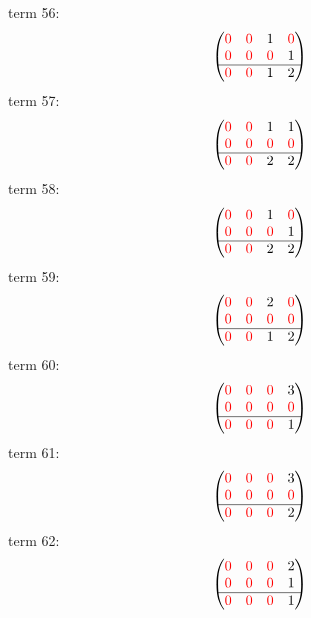 \documentclass{article}
\begin{document}
term 56:
$$\begin{pmatrix}{\color{red} 0} & {\color{red} 0} & 1 & {\color{red} 0}\\
{\color{red} 0} & {\color{red} 0} & {\color{red} 0} & 1\\
\hline{\color{red} 0} & {\color{red} 0} & 1 & 2\\
\end{pmatrix}$$
term 57:
$$\begin{pmatrix}{\color{red} 0} & {\color{red} 0} & 1 & 1\\
{\color{red} 0} & {\color{red} 0} & {\color{red} 0} & {\color{red} 0}\\
\hline{\color{red} 0} & {\color{red} 0} & 2 & 2\\
\end{pmatrix}$$
term 58:
$$\begin{pmatrix}{\color{red} 0} & {\color{red} 0} & 1 & {\color{red} 0}\\
{\color{red} 0} & {\color{red} 0} & {\color{red} 0} & 1\\
\hline{\color{red} 0} & {\color{red} 0} & 2 & 2\\
\end{pmatrix}$$
term 59:
$$\begin{pmatrix}{\color{red} 0} & {\color{red} 0} & 2 & {\color{red} 0}\\
{\color{red} 0} & {\color{red} 0} & {\color{red} 0} & {\color{red} 0}\\
\hline{\color{red} 0} & {\color{red} 0} & 1 & 2\\
\end{pmatrix}$$
term 60:
$$\begin{pmatrix}{\color{red} 0} & {\color{red} 0} & {\color{red} 0} & 3\\
{\color{red} 0} & {\color{red} 0} & {\color{red} 0} & {\color{red} 0}\\
\hline{\color{red} 0} & {\color{red} 0} & {\color{red} 0} & 1\\
\end{pmatrix}$$
term 61:
$$\begin{pmatrix}{\color{red} 0} & {\color{red} 0} & {\color{red} 0} & 3\\
{\color{red} 0} & {\color{red} 0} & {\color{red} 0} & {\color{red} 0}\\
\hline{\color{red} 0} & {\color{red} 0} & {\color{red} 0} & 2\\
\end{pmatrix}$$
term 62:
$$\begin{pmatrix}{\color{red} 0} & {\color{red} 0} & {\color{red} 0} & 2\\
{\color{red} 0} & {\color{red} 0} & {\color{red} 0} & 1\\
\hline{\color{red} 0} & {\color{red} 0} & {\color{red} 0} & 1\\
\end{pmatrix}$$
\end{document}
